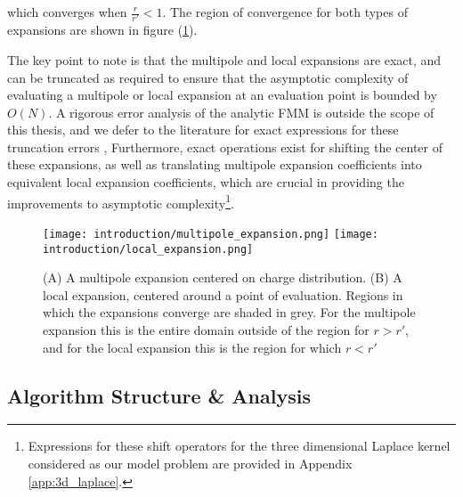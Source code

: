 which converges when $\frac{r}{r'} < 1$. The region of convergence for both types
of expansions are shown in figure (\ref{fig:1_1_multipole_local_expansions}).

The key point to note is that the multipole and local expansions are exact, and
can be truncated as required to ensure that the asymptotic complexity of evaluating
a multipole or local expansion at an evaluation point is bounded by $O(N)$. A
rigorous error analysis of the analytic FMM is outside the scope of this thesis, and
we defer to the literature for exact expressions for these truncation errors \cite{Greengard:1987:Yale},
Furthermore, exact operations exist for shifting the center of these expansions,
as well as translating multipole expansion coefficients into equivalent local expansion
coefficients,
which are crucial in providing the improvements to asymptotic complexity\footnote{
    Expressions for these shift operators for the three dimensional Laplace kernel
    considered as our model problem are provided in Appendix \ref{app:3d_laplace}.
}.

\begin{figure}[!h]
    \centering
    {\texttt{[image: introduction/multipole\_expansion.png]}}
    \hfill
  {\texttt{[image: introduction/local\_expansion.png]}}
  \vspace{0pt}
  \caption{(A) A multipole expansion centered on charge distribution. (B) A local
  expansion, centered around a point of evaluation. Regions in which the expansions
  converge are shaded in grey. For the multipole expansion this is the entire domain
  outside of the region for $r>r'$, and for the local expansion this is the region
  for which $r < r'$}

  \label{fig:1_1_multipole_local_expansions}
\end{figure}

\hspace{10pt}

\subsection{Algorithm Structure \& Analysis}


